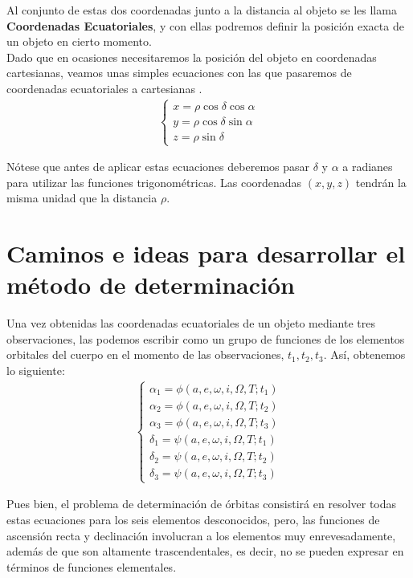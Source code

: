 Al conjunto de estas dos coordenadas junto a la distancia al objeto se les llama \textbf{Coordenadas Ecuatoriales}, y con ellas podremos definir la posición exacta de un objeto en cierto momento.\\

Dado que en ocasiones necesitaremos la posición del objeto en coordenadas cartesianas, veamos unas simples ecuaciones con las que pasaremos de coordenadas ecuatoriales a cartesianas \cite{moulton}.
\begin{align}
\left\{
\begin{array}{l}
	x = \rho \cos{\delta}\cos{\alpha}\\
	y = \rho \cos{\delta}\sin{\alpha}\\
	z = \rho \sin{\delta}
\end{array}
\right.
\label{eq:equatorial_to_cartesian}
\end{align}

Nótese que antes de aplicar estas ecuaciones deberemos pasar $\delta$ y $\alpha$ a radianes para utilizar las funciones trigonométricas. Las coordenadas $(x,y,z)$ tendrán la misma unidad que la distancia $\rho$.\\

\section{Caminos e ideas para desarrollar el método de determinación}
\label{sec:ideas_for_develope_method}
Una vez obtenidas las coordenadas ecuatoriales de un objeto mediante tres observaciones, las podemos escribir como un grupo de funciones de los elementos orbitales del cuerpo en el momento de las observaciones, $t_1, t_2, t_3$. Así, obtenemos lo siguiente:
\begin{align}
\left\{\begin{array}{l}
	\alpha_1 = \phi(a, e, \omega, i, \Omega, T; t_1)\\ 
	\alpha_2 = \phi(a, e, \omega, i, \Omega, T; t_2)\\ 
	\alpha_3 = \phi(a, e, \omega, i, \Omega, T; t_3)\\ 
	\delta_1 = \psi(a, e, \omega, i, \Omega, T; t_1)\\ 
	\delta_2 = \psi(a, e, \omega, i, \Omega, T; t_2)\\
	\delta_3 = \psi(a, e, \omega, i, \Omega, T; t_3)
\end{array}
\right.
\label{eq:ascension_declinacion}
\end{align}

Pues bien, el problema de determinación de órbitas consistirá en resolver todas estas ecuaciones para los seis elementos desconocidos, pero, las funciones de ascensión recta y declinación involucran a los elementos muy enrevesadamente, además de que son altamente trascendentales, es decir, no se pueden expresar en términos de funciones elementales.\\

